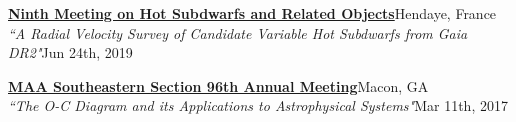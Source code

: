 \documentclass[letterpaper,12pt]{article}
\begin{document}
\vspace{3mm}
\noindent{}

\begin{etaremune}
    \item \href{https://sdob9.sciencesconf.org/}{{\small\textbf{Ninth Meeting on Hot Subdwarfs and Related Objects}}}\hfill{\small Hendaye, France}\\
    {\footnotesize \textit{``A Radial Velocity Survey of Candidate Variable Hot Subdwarfs from Gaia DR2"}\hfill \footnotesize Jun 24th, 2019}
    \item \href{http://sections.maa.org/southeastern/2017Conference/}{{\small\textbf{MAA Southeastern Section 96th Annual Meeting}}}\hfill{\small Macon, GA}\\
    {\footnotesize \textit{``The O-C Diagram and its Applications to Astrophysical Systems"}\hfill \footnotesize Mar 11th, 2017}
\end{etaremune}

\vspace{3mm}
\noindent{}
\end{document}
